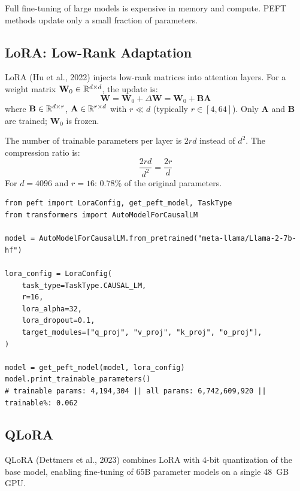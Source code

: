 Full fine-tuning of large models is expensive in memory and compute. PEFT
methods update only a small fraction of parameters.

\subsection{LoRA: Low-Rank Adaptation}

\begin{definition}[LoRA]
LoRA (Hu et al., 2022) injects low-rank matrices into attention layers. For a
weight matrix $\mathbf{W}_0 \in \mathbb{R}^{d \times d}$, the update is:
\[
\mathbf{W} = \mathbf{W}_0 + \Delta \mathbf{W} = \mathbf{W}_0 + \mathbf{B}\mathbf{A}
\]
where $\mathbf{B} \in \mathbb{R}^{d \times r}$, $\mathbf{A} \in \mathbb{R}^{r \times d}$ with
$r \ll d$ (typically $r \in [4, 64]$). Only $\mathbf{A}$ and $\mathbf{B}$ are
trained; $\mathbf{W}_0$ is frozen.
\end{definition}

\begin{proposition}
The number of trainable parameters per layer is $2rd$ instead of $d^2$. The
compression ratio is:
\[
\frac{2rd}{d^2} = \frac{2r}{d}
\]
For $d = 4096$ and $r = 16$: $0.78\%$ of the original parameters.
\end{proposition}

\begin{codeblock}[title=\textbf{LoRA with PEFT}]
\begin{verbatim}
from peft import LoraConfig, get_peft_model, TaskType
from transformers import AutoModelForCausalLM

model = AutoModelForCausalLM.from_pretrained("meta-llama/Llama-2-7b-hf")

lora_config = LoraConfig(
    task_type=TaskType.CAUSAL_LM,
    r=16,
    lora_alpha=32,
    lora_dropout=0.1,
    target_modules=["q_proj", "v_proj", "k_proj", "o_proj"],
)

model = get_peft_model(model, lora_config)
model.print_trainable_parameters()
# trainable params: 4,194,304 || all params: 6,742,609,920 || trainable%: 0.062
\end{verbatim}
\end{codeblock}

\subsection{QLoRA}

\begin{definition}[QLoRA]
QLoRA (Dettmers et al., 2023) combines LoRA with 4-bit quantization of the
base model, enabling fine-tuning of 65B parameter models on a single 48~GB GPU.
\end{definition}

